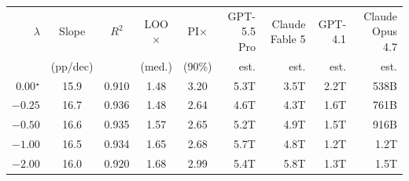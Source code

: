\begin{tabular}{rccccrrrr}
\toprule
$\lambda$ & Slope & $R^2$ & LOO$\times$ & PI$\times$ & GPT-5.5 Pro & Claude Fable 5 & GPT-4.1 & Claude Opus 4.7 \\
 & (pp/dec) & & (med.) & (90\%) & est. & est. & est. & est. \\
\midrule
$0.00$\;$^\star$ & 15.9 & 0.910 & 1.48 & 3.20 & 5.3T & 3.5T & 2.2T & 538B \\
$-0.25$ & 16.7 & 0.936 & 1.48 & 2.64 & 4.6T & 4.3T & 1.6T & 761B \\
$-0.50$ & 16.6 & 0.935 & 1.57 & 2.65 & 5.2T & 4.9T & 1.5T & 916B \\
$-1.00$ & 16.5 & 0.934 & 1.65 & 2.68 & 5.7T & 4.8T & 1.2T & 1.2T \\
$-2.00$ & 16.0 & 0.920 & 1.68 & 2.99 & 5.4T & 5.8T & 1.3T & 1.5T \\
\bottomrule
\end{tabular}
